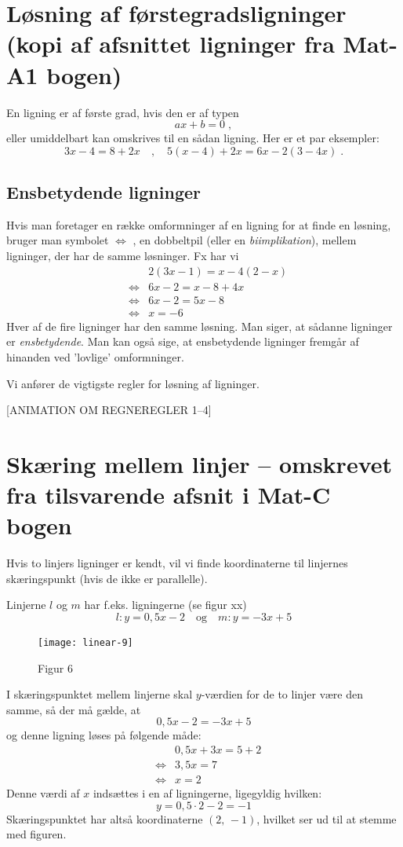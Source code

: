 \documentclass[12pt,oneside,a4paper]{article}
\newcommand{\bas}{\begin{eqnarray*}}
\newcommand{\eas}{\end{eqnarray*}}
\begin{document}
\section{Løsning af førstegradsligninger (kopi af afsnittet ligninger fra Mat-A1 bogen)}
En ligning er af første grad, hvis den er af typen
$$
ax + b = 0\; ,
$$
eller umiddelbart kan omskrives til en sådan ligning. Her er et par eksempler:
$$
3x - 4 = 8 + 2x \quad , \quad 5(x - 4) + 2x = 6x - 2(3 - 4x)\; .
$$

\subsection{Ensbetydende ligninger}
Hvis man foretager en række omformninger af en ligning for at finde en løsning,
bruger man symbolet $\Leftrightarrow$ , en dobbeltpil (eller en {\em biimplikation}), mellem
ligninger, der har de samme løsninger. Fx har vi
\bas
&& 2(3x - 1) = x - 4(2 - x)\\
&\Leftrightarrow& 6x - 2 = x - 8 + 4x\\
&\Leftrightarrow& 6x - 2 = 5x - 8 \\
&\Leftrightarrow& x = -6 
\eas
Hver af de fire ligninger har den samme løsning. Man siger, at sådanne
ligninger er {\em ensbetydende}. Man kan også sige, at ensbetydende ligninger fremgår
af hinanden ved ’lovlige’ omformninger.

Vi anfører de vigtigste regler for løsning af ligninger.

[ANIMATION OM REGNEREGLER 1--4]


\section{Skæring mellem linjer -- omskrevet fra tilsvarende afsnit i Mat-C bogen}
Hvis to linjers ligninger er kendt, vil vi finde koordinaterne til linjernes
skæringspunkt (hvis de ikke er parallelle).

Linjerne $l$ og $m$ har f.eks. ligningerne (se figur xx)
$$
l: y=0,5x-2\quad{\mbox{og}}\quad m: y=-3x+5
$$

\begin{figure}[ht]
    \centering
    \texttt{[image: linear-9]}
    \caption{Figur 6}
    \label{fig6}
\end{figure}

I skæringspunktet mellem linjerne skal $y$-værdien for de to linjer være den
samme, så der må gælde, at
$$
0,5x-2 = -3x+5
$$
og denne ligning løses på følgende måde:
\bas
&& 0,5x+3x=5+2\\
&\iff& 3,5x=7\\
&\iff& x=2
\eas
Denne værdi af $x$ indsættes i en af ligningerne, ligegyldig hvilken:
$$
y=0,5\cdot2-2=-1
$$
Skæringspunktet har altså koordinaterne $(2,\,-1)$, hvilket ser ud til at
stemme med figuren.
\end{document}
